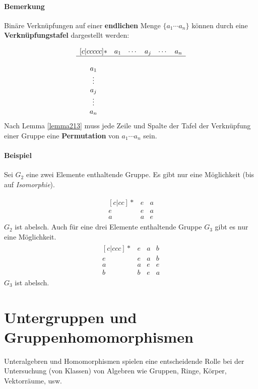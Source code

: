 \documentclass[11pt]{report}
\newcommand*\f[1] {\textbf{#1}}
\begin{document}
\paragraph{Bemerkung} Binäre Verknüpfungen auf einer \f{endlichen} Menge $\{a_1 \cdots a_n\}$ können durch eine \f{Verknüpfungstafel} dargestellt werden:

\begin{align}
\begin{matrix}[c|ccccc]
 * & a_1 & \cdots & a_j & \cdots & a_n \\
\hline \\
a_1 & & & & & \\
\vdots & & & & & \\
a_j & & & & & \\
\vdots & & & & & \\
a_n & & & & &
\end{matrix}
\end{align}
Nach Lemma \ref{lemma213} muss jede Zeile und Spalte der Tafel der Verknüpfung einer Gruppe eine \f{Permutation} von $a_1 \cdots a_n$ sein.

\paragraph{Beispiel} Sei $G_2$ eine zwei Elemente enthaltende Gruppe. Es gibt nur eine Möglichkeit (bis auf \textit{Isomorphie}).

\begin{align}
\begin{matrix}[c|cc]
 * & e & a\\
\hline
e & e & a \\
a & a & e
\end{matrix}
\end{align}
$G_2$ ist abelsch.
Auch für eine drei Elemente enthaltende Gruppe $G_3$ gibt es nur eine Möglichkeit.
\begin{align}
 \begin{matrix}[c|ccc]
 * & e & a & b \\
\hline
e & e & a & b\\
a & a & e & e\\
b & b & e & a
\end{matrix}
\end{align}
$G_3$ ist abelsch.

\section{Untergruppen und Gruppenhomomorphismen}
Unteralgebren und Homomorphismen spielen eine entscheidende Rolle bei der Untersuchung (von Klassen) von Algebren wie Gruppen, Ringe, Körper, Vektorräume, usw.
\end{document}
